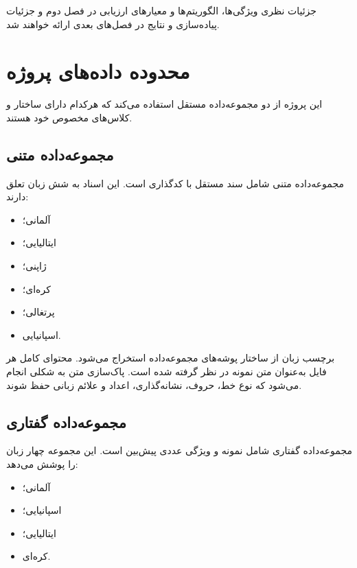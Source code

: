 \documentclass[12pt,a4paper,oneside]{report}
\begin{document}
جزئیات نظری ویژگی‌ها، الگوریتم‌ها و معیارهای ارزیابی در فصل دوم و جزئیات پیاده‌سازی و نتایج در فصل‌های بعدی ارائه خواهند شد.


\section{محدوده داده‌های پروژه}

این پروژه از دو مجموعه‌داده مستقل استفاده می‌کند که هرکدام دارای ساختار و کلاس‌های مخصوص خود هستند.


\subsection{مجموعه‌داده متنی}

مجموعه‌داده متنی شامل
سند مستقل با کدگذاری
است. این اسناد به شش زبان تعلق دارند:

\begin{itemize}

	\item آلمانی؛

	\item ایتالیایی؛

	\item ژاپنی؛

	\item کره‌ای؛

	\item پرتغالی؛

	\item اسپانیایی.

\end{itemize}

برچسب زبان از ساختار پوشه‌های مجموعه‌داده استخراج می‌شود. محتوای کامل هر فایل به‌عنوان متن نمونه در نظر گرفته شده است. پاک‌سازی متن به شکلی انجام می‌شود که نوع خط، حروف، نشانه‌گذاری، اعداد و علائم زبانی حفظ شوند.


\subsection{مجموعه‌داده گفتاری}

مجموعه‌داده گفتاری شامل
نمونه و
ویژگی عددی پیش‌بین است. این مجموعه چهار زبان را پوشش می‌دهد:

\begin{itemize}

	\item آلمانی؛

	\item اسپانیایی؛

	\item ایتالیایی؛

	\item کره‌ای.

\end{itemize}
\end{document}
